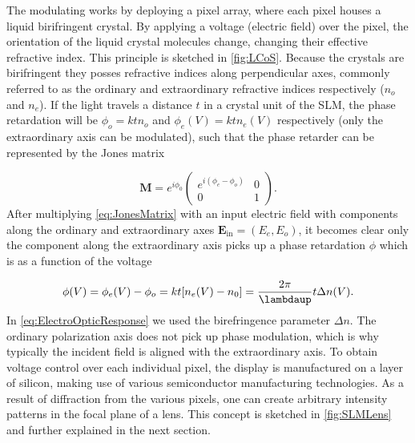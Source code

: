 The modulating works by deploying a pixel array, where each pixel houses a liquid birifringent crystal.
By applying a voltage (electric field) over the pixel, the orientation of the liquid crystal molecules change, changing their effective refractive index.
This principle is sketched in \cref{fig:LCoS}.
Because the crystals are birifringent they posses refractive indices along perpendicular axes, commonly referred to as the ordinary and extraordinary refractive indices respectively ($n_o$ and $n_e$). 
If the light travels a distance $t$ in a crystal unit of the SLM, the phase retardation will be $\phi_o = k t n_o$ and $\phi_e(V) = k t n_e(V)$ respectively (only the extraordinary axis can be modulated), such that the phase retarder can be represented by the Jones matrix \cite{Guzman2017}

\begin{equation}\label{eq:JonesMatrix}
    \mathbf{M} = e^{i \phi_0} 
    \begin{pmatrix}
        e^{i(\phi_e-\phi_o)} & 0\\
        0 & 1
    \end{pmatrix}.
\end{equation}
After multiplying \cref{eq:JonesMatrix} with an input electric field with components along the ordinary and extraordinary axes $\mathbf{E}_{\text{in}} = (E_e, E_o)$, it becomes clear only the component along the extraordinary axis picks up a phase retardation $\phi$ which is as a function of the voltage \cite{Guzman2017}

\begin{equation}\label{eq:ElectroOpticResponse}
    \phi(V) = \phi_e(V) - \phi_o =  k t[n_e(V) - n_0]  = \frac{2\pi}{\lambdaup}t \Delta n(V).
\end{equation}
In \cref{eq:ElectroOpticResponse} we used the birefringence parameter $\Delta n$.
The ordinary polarization axis does not pick up phase modulation, which is why typically the incident field is aligned with the extraordinary axis.
To obtain voltage control over each individual pixel, the display is manufactured on a layer of silicon, making use of various semiconductor manufacturing technologies.
As a result of diffraction from the various pixels, one can create arbitrary intensity patterns in the focal plane of a lens.
This concept is sketched in \cref{fig:SLMLens} and further explained in the next section.


